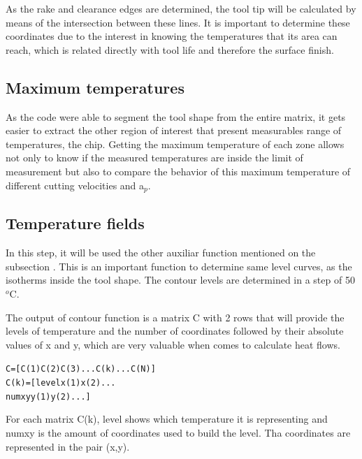 		As the rake and clearance edges are determined, the tool tip will be calculated by means of the intersection between these lines. It is important to determine these coordinates due to the interest in knowing the temperatures that its area can reach, which is related directly with tool life and therefore the surface finish.

	\subsection{Maximum temperatures}

	As the code were able to segment the tool shape from the entire matrix, it gets easier to extract the other region of interest that present measurables range of temperatures, the chip. Getting the maximum temperature of each zone allows not only to know if the measured temperatures are inside the limit of measurement but also to compare the behavior of this maximum temperature of different cutting velocities and a$_{p}$.

	\subsection{Temperature fields}

	In this step, it will be used the other auxiliar function mentioned on the subsection . This is an important function to determine same level curves, as the isotherms inside the tool shape. The contour levels are determined in a step of 50 $^{o}$C.

	
	

	The output of contour function is a matrix C with 2 rows that will provide the levels of temperature and the number of coordinates followed by their absolute values of x and y, which are very valuable when comes to calculate heat flows.

		\begin{mdframed}[backgroundcolor=lightgray!25!]
		\begin{alltt}\fontsize{9pt}{8pt}\selectfont
		C    =  [C(1) C(2) C(3) ...C(k)... C(N)]
		C(k) =  [level x(1) x(2)...
		         numxy y(1) y(2)...]
		\end{alltt}
		\end{mdframed}
	
	For each matrix C(k), level shows which temperature it is representing and numxy is the amount of coordinates used to build the level. Tha coordinates are represented in the pair (x,y).

